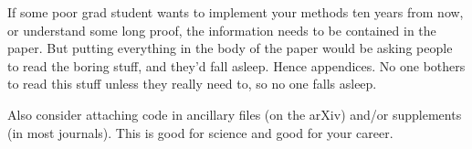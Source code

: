 \documentclass[reprint, aps, prd, letterpaper, noshowpacs, amsmath, %
amssymb, amsfonts, nofootinbib, floatfix, superscriptaddress, %
twoside]{revtex4-1}
\begin{document}
If some poor grad student wants to implement your methods ten years
from now, or understand some long proof, the information needs to be
contained in the paper.  But putting everything in the body of the
paper would be asking people to read the boring stuff, and they'd fall
asleep.  Hence appendices.  No one bothers to read this stuff unless
they really need to, so no one falls asleep.

Also consider attaching code in ancillary files (on the arXiv) and/or
supplements (in most journals).  This is good for science and good for
your career.



\vfil


\let\c\Originalcdefinition
\let\d\Originalddefinition
\let\i\Originalidefinition



\end{document}
